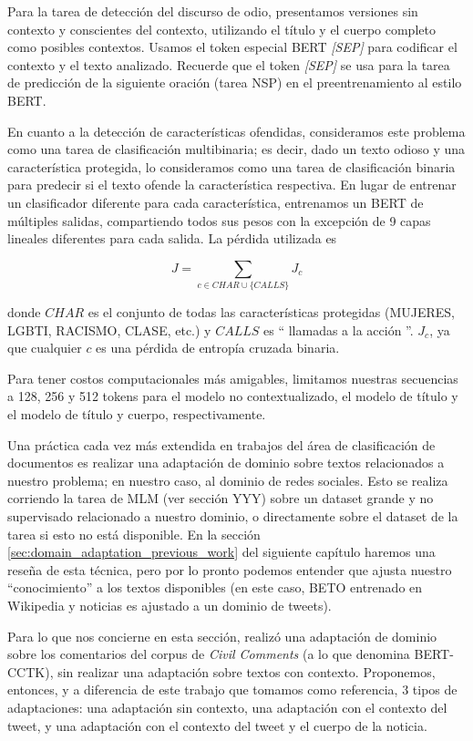 Para la tarea de detección del discurso de odio, presentamos versiones sin contexto y conscientes del contexto, utilizando el título y el cuerpo completo como posibles contextos. Usamos el token especial BERT \emph {[SEP]} para codificar el contexto y el texto analizado. Recuerde que el token \emph {[SEP]} se usa para la tarea de predicción de la siguiente oración (tarea NSP) en el preentrenamiento al estilo BERT.


En cuanto a la detección de características ofendidas, consideramos este problema como una tarea de clasificación multibinaria; es decir, dado un texto odioso y una característica protegida, lo consideramos como una tarea de clasificación binaria para predecir si el texto ofende la característica respectiva. En lugar de entrenar un clasificador diferente para cada característica, entrenamos un BERT de múltiples salidas, compartiendo todos sus pesos con la excepción de 9 capas lineales diferentes para cada salida. La pérdida utilizada es

\begin{equation*}
    J = \sum\limits_{c \in CHAR \cup \{CALLS\}} J_c
\end{equation*}

donde $CHAR$ es el conjunto de todas las características protegidas (MUJERES, LGBTI, RACISMO, CLASE, etc.) y $CALLS$ es `` llamadas a la acción ''. $ J_c $, ya que cualquier $ c $ es una pérdida de entropía cruzada binaria.

Para tener costos computacionales más amigables, limitamos nuestras secuencias a 128, 256 y 512 tokens para el modelo no contextualizado, el modelo de título y el modelo de título y cuerpo, respectivamente.

Una práctica cada vez más extendida en trabajos del área de clasificación de documentos es realizar una adaptación de dominio sobre textos relacionados a nuestro problema; en nuestro caso, al dominio de redes sociales. Esto se realiza corriendo la tarea de MLM (ver sección YYY) sobre un dataset grande y no supervisado relacionado a nuestro dominio, o directamente sobre el dataset de la tarea si esto no está disponible. En la sección \ref{sec:domain_adaptation_previous_work} del siguiente capítulo haremos una reseña de esta técnica, pero por lo pronto podemos entender que ajusta nuestro ``conocimiento'' a los textos disponibles (en este caso, BETO entrenado en Wikipedia y noticias es ajustado a un dominio de tweets).

Para lo que nos concierne en esta sección, \citet{pavlopoulos2020toxicity} realizó una adaptación de dominio sobre los comentarios del corpus de \emph{Civil Comments} (a lo que denomina BERT-CCTK), sin realizar una adaptación sobre textos con contexto. Proponemos, entonces, y a diferencia de este trabajo que tomamos como referencia, 3 tipos de adaptaciones: una adaptación sin contexto, una adaptación con el contexto del tweet, y una adaptación con el contexto del tweet y el cuerpo de la noticia.

